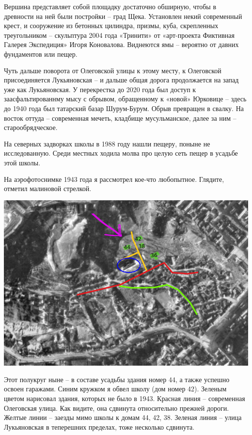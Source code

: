 Вершина представляет собой площадку достаточно обширную, чтобы в древности на ней были постройки – град Щека. Установлен некий современный крест, и сооружение из бетонных  цилиндра, призмы, куба, скрепленных треугольником – скульптура 2004 года «Тринити» от «арт-проекта Фиктивная Галерея Экспедиция» Игоря Коновалова. Виднеются ямы – вероятно от давних фундаментов или пещер.

Чуть дальше поворота от Олеговской улицы к этому месту, к Олеговской присоединяется Лукьяновская – и дальше общая дорога продолжается на запад уже как Лукьяновская. У перекрестка до 2020 года был доступ к заасфальтированнму мысу с обрывом, обращенному к «новой» Юрковице – здесь до 1940 года был татарский базар Шурум-Бурум. Обрыв превращен в свалку. На восток оттуда – современная мечеть, кладбище мусульманское, далее за ним – старообрядческое.

На северных задворках школы в 1988 году нашли пещеру, поныне не исследованную. Среди местных ходила молва про целую сеть пещер в усадьбе этой школы.

На аэрофотоснимке 1943 года я рассмотрел кое-что любопытное. Глядите, отметил малиновой стрелкой.

\begin{center}
\includegraphics[width=\linewidth]{chast-colebanie-osnov/sheka/she.jpg}
\end{center}

Этот полукруг ныне – в составе усадьбы здания номер 44, а также успешно освоен гаражами. Синим кружком я обвел школу (дом номер 42). Зеленым цветом нарисовал здания, которых не было в 1943. Красная линия – современная Олеговская улица. Как видите, она сдвинута относительно прежней дороги. Желтые линии – заезды мимо школы к домам 44, 42, 38. Зеленая линия – улица Лукьяновская в теперешних пределах, тоже несколько сдвинута.

